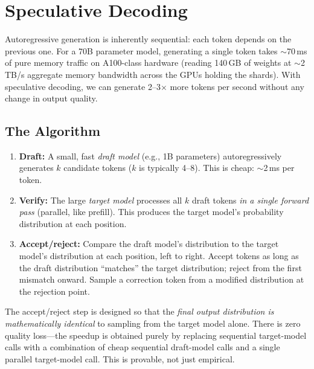 \section{Speculative Decoding}
\label{sec:speculative_decoding}

Autoregressive generation is inherently sequential: each token depends on the previous
one.  For a 70B parameter model, generating a single token takes $\sim$70\,ms of pure
memory traffic on A100-class hardware (reading 140\,GB of weights at $\sim$2\,TB/s
aggregate memory bandwidth across the GPUs holding the shards).  With speculative
decoding, we can generate 2--3$\times$ more tokens per second without any change in
output quality.

\subsection{The Algorithm}

\begin{enumerate}
    \item \textbf{Draft:} A small, fast \emph{draft model} (e.g., 1B parameters)
          autoregressively generates $k$ candidate tokens ($k$ is typically 4--8).
          This is cheap: $\sim$2\,ms per token.
    \item \textbf{Verify:} The large \emph{target model} processes all $k$ draft tokens
          \emph{in a single forward pass} (parallel, like prefill).  This produces
          the target model's probability distribution at each position.
    \item \textbf{Accept/reject:} Compare the draft model's distribution to the target
          model's distribution at each position, left to right.  Accept tokens as long
          as the draft distribution ``matches'' the target distribution; reject from the
          first mismatch onward.  Sample a correction token from a modified distribution
          at the rejection point.
\end{enumerate}

\begin{keyinsight}
The accept/reject step is designed so that the \emph{final output distribution is
mathematically identical} to sampling from the target model alone.  There is zero quality
loss---the speedup is obtained purely by replacing sequential target-model calls with a
combination of cheap sequential draft-model calls and a single parallel target-model call.
This is provable, not just empirical.
\end{keyinsight}

